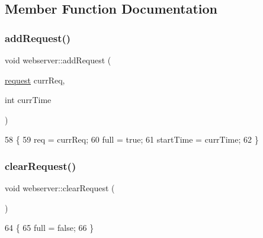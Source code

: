 \subsection{Member Function Documentation}
\mbox{\label{classwebserver_a013eb6e8956b29bcc13608bb54bd2cc5}} 
\subsubsection{\texorpdfstring{add\+Request()}{addRequest()}}
{\footnotesize\ttfamily void webserver\+::add\+Request (\begin{DoxyParamCaption}\item[{\hyperlink{structrequest}{request}}]{curr\+Req,  }\item[{int}]{curr\+Time }\end{DoxyParamCaption})\hspace{0.3cm}{\ttfamily [inline]}}


\begin{DoxyCode}
58                                                        \{
59             req = currReq;
60             full = \textcolor{keyword}{true};
61             startTime = currTime;
62         \}
\end{DoxyCode}
\mbox{\label{classwebserver_ab2c7ce0a757e7f5e6c9c33d1e7ff1cbc}} 
\subsubsection{\texorpdfstring{clear\+Request()}{clearRequest()}}
{\footnotesize\ttfamily void webserver\+::clear\+Request (\begin{DoxyParamCaption}{ }\end{DoxyParamCaption})\hspace{0.3cm}{\ttfamily [inline]}}


\begin{DoxyCode}
64                             \{
65             full = \textcolor{keyword}{false};
66         \}
\end{DoxyCode}
\mbox{\label{classwebserver_ab60b4b73f23fab34800070996212c497}} 

